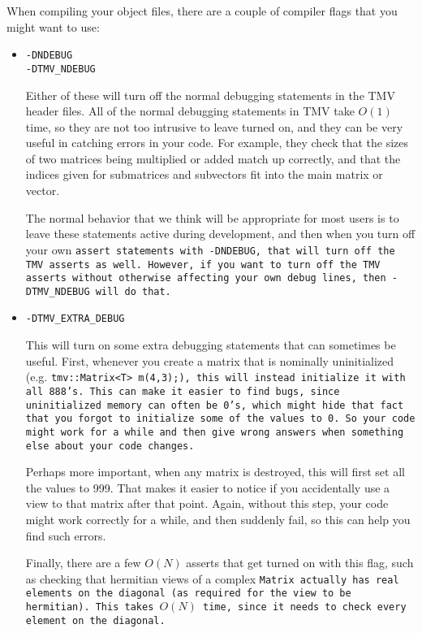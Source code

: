 When compiling your object files, there are a couple of compiler flags that you might want to use:
\begin{itemize}
\item
\texttt{-DNDEBUG}\\
\texttt{-DTMV\_NDEBUG}

Either of these will turn off the normal debugging statements in the TMV header files.  All of the normal debugging statements in TMV take $O(1)$ time, so they are not too intrusive to leave turned on, and they can be very useful in catching errors in your code.  For example, they check that the sizes of two matrices being multiplied or added match up correctly, and that the indices given for submatrices and subvectors fit into the main matrix or vector.  

The normal behavior that we think will be appropriate for most users is to leave these statements active during development, and then when you turn off your own \tt{assert} statements with \tt{-DNDEBUG}, that will turn off the TMV asserts as well.  However, if you want to turn off the TMV asserts without otherwise affecting your own debug lines, then \tt{-DTMV\_NDEBUG} will do that.

\item
\texttt{-DTMV\_EXTRA\_DEBUG}

This will turn on some extra debugging statements that can sometimes be useful.  First, whenever you create a matrix that is nominally uninitialized (e.g. \tt{tmv::Matrix<T> m(4,3);}), this will instead initialize it with all 888's.  This can make it easier to find bugs, since uninitialized memory can often be 0's, which might hide that fact that you forgot to initialize some of the values to 0.  So your code might work for a while and then give wrong answers when something else about your code changes.

Perhaps more important, when any matrix is destroyed, this will first set all the values to 999.  That makes it easier to notice if you accidentally use a view to that matrix after that point.  Again, without this step, your code might work correctly for a while, and then suddenly fail, so this can help you find such errors.

Finally, there are a few $O(N)$ asserts that get turned on with this flag, such as checking that hermitian views of a complex \tt{Matrix} actually has real elements on the diagonal (as required for the view to be hermitian).  This takes $O(N)$ time, since it needs to check every element on the diagonal.  

\end{itemize}

